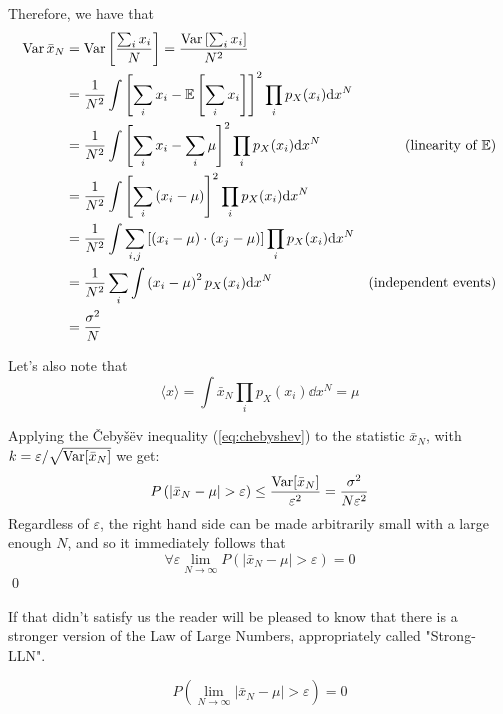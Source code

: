 \begin{example}
Therefore, we have that
\begin{align*}
	\operatorname{Var}{\bar{x}_N} &= \operatorname{Var}\left[ \frac{\sum_i x_i}{N} \right] = \frac{\operatorname{Var}\left[ \sum_i x_i \right]}{N^2} \\
	&= \frac{1}{N^2}\int\left[ \sum_i x_i - \mathbb{E}\left[ \sum_i x_i \right] \right]^2\prod_i p_X(x_i)\mathrm{d} x^N \\ 
	&= \frac{1}{N^2}\int\left[ \sum_i x_i - \sum_i \mu \right]^2\prod_i p_X(x_i)\mathrm{d} x^N & \text{(linearity of $\mathbb{E}$)}\\ 
	&= \frac{1}{N^2}\int\left[ \sum_i \left( x_i - \mu \right) \right]^2\prod_i p_X(x_i)\mathrm{d} x^N \\
	&= \frac{1}{N^2}\int \sum_{i,j}\left[\left( x_i - \mu \right)\cdot\left( x_j - \mu \right)\right]\prod_i p_X(x_i)\mathrm{d} x^N\\
	&= \frac{1}{N^2}\sum_{i}\int \left( x_i - \mu \right)^2p_X(x_i)\mathrm{d} x^N & \text{(independent events)}\\
	&= \frac{\sigma^2}{N}
\end{align*}

Let's also note that
	\[
	\langle x \rangle = \int \bar{x}_N \prod_i p_X(x_i)\dd x^N = \mu
	\]
	
Applying the Čebyšëv inequality (\ref{eq:chebyshev}) to the statistic $\bar{x}_N$, with $k=\varepsilon/\sqrt{\operatorname{Var}[{\bar{x}_N}]}$ we get:
	\[
	P\left( \left| \bar{x}_N-\mu \right| > \varepsilon\right) \leq \frac{\operatorname{Var}[{\bar{x}_N}]}{\varepsilon^2} = \frac{\sigma^2}{N\varepsilon^2} 
	\]
Regardless of $\varepsilon$, the right hand side can be made arbitrarily small with a large enough $N$, and so it immediately follows that
	\[
	\forall \varepsilon \lim_{N\to\infty} P\left( \left| \bar{x}_N-\mu \right| > \varepsilon\right)= 0 
	\]
	\qed
\end{example}

If that didn't satisfy us the reader will be pleased to know that there is a stronger version of the Law of Large Numbers, appropriately called "Strong-LLN". 

\begin{theorem}
	\[
	P\left( \lim_{N\to\infty} \left| \bar{x}_N - \mu \right| > \varepsilon \right) = 0
	\]
\end{theorem}

